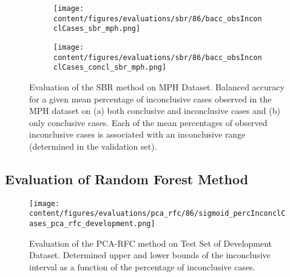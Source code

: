 \begin{figure}[t]
  \begin{subfigure}{0.9\textwidth}
    \centering
    \texttt{[image: content/figures/evaluations/sbr/86/bacc\_obsInconclCases\_sbr\_mph.png]}
    \subcaption{}
    \label{fig:bacc_obsInconclCases_sbr_mph}
  \end{subfigure}
  \hfill
  \begin{subfigure}{0.9\textwidth}
    \centering
    \texttt{[image: content/figures/evaluations/sbr/86/bacc\_obsInconclCases\_concl\_sbr\_mph.png]}
    \subcaption{}
    \label{fig:bacc_obsInconclCases_concl_sbr_mph}
  \end{subfigure}

  \caption{Evaluation of the SBR method on MPH Dataset.
  Balanced accuracy for a given mean percentage of inconclusive cases observed in the MPH dataset on 
  (a) both conclusive and inconclusive cases and (b) only conclusive cases. 
  Each of the mean percentages of observed inconclusive cases is associated 
  with an inconclusive range (determined in the validation set). }
  \label{fig:bacc_obsInconclCases_sbr_mph_full}
\end{figure}




\subsection{Evaluation of Random Forest Method}
\label{subsec:eval_rfc}




\begin{figure}[t]
  \centering
  \texttt{[image: content/figures/evaluations/pca\_rfc/86/sigmoid\_percInconclCases\_pca\_rfc\_development.png]}
  \caption{Evaluation of the PCA-RFC method on Test Set of Development Dataset. 
  Determined upper and lower bounds of the inconclusive interval as a function of the percentage of inconclusive cases.} 
  \label{fig:pca_rfc_percInconclCases_development}
\end{figure}


